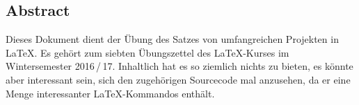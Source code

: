 \documentclass{scrreprt}
\begin{document}
\subsection*{Abstract}
Dieses Dokument dient der Übung des Satzes von umfangreichen Projekten in \LaTeX{}. Es gehört zum siebten Übungszettel des \LaTeX-Kurses im Wintersemester 2016\,/\,17. Inhaltlich hat es so ziemlich nichts zu bieten, es könnte aber interessant sein, sich den zugehörigen Sourcecode mal anzusehen, da er eine Menge interessanter \LaTeX-Kommandos enthält.









\end{document}
